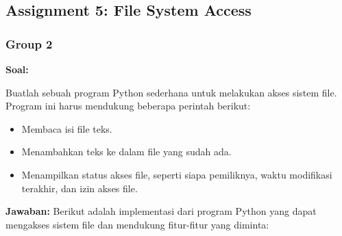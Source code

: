\documentclass[12pt]{article}
\begin{document}
\subsection{Assignment 5: File System Access}
\subsubsection{Group 2}
    \textbf{Soal:}
    \par Buatlah sebuah program Python sederhana untuk melakukan akses sistem file. Program ini harus mendukung beberapa perintah berikut:
    \begin{itemize}
    \item Membaca isi file teks.
    \item Menambahkan teks ke dalam file yang sudah ada.
    \item Menampilkan status akses file, seperti siapa pemiliknya, waktu modifikasi terakhir, dan izin akses file.
    \end{itemize}
    
    \textbf{Jawaban:}
    Berikut adalah implementasi dari program Python yang dapat mengakses sistem file dan mendukung fitur-fitur yang diminta:
    
\end{document}
